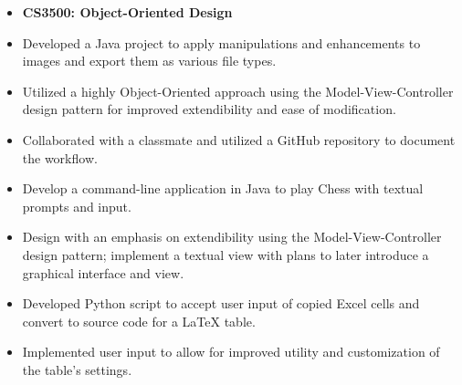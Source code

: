 \documentclass[10pt,a4paper,ragged2e,withhyper]{altacv}
\begin{document}
\begin{paracol}{2}

    \switchcolumn



    \vspace{-2em}
    \begin{itemize}
        \item[] \textbf{CS3500: Object-Oriented Design}
        \item Developed a Java project to apply manipulations and enhancements to images and export them as various file types.
        \item Utilized a highly Object-Oriented approach using the Model-View-Controller design pattern for improved extendibility and ease of modification.
        \item Collaborated with a classmate and utilized a GitHub repository to document the workflow.
    \end{itemize}

    \begin{itemize}
        \item Develop a command-line application in Java to play Chess with textual prompts and input.
        \item Design with an emphasis on extendibility using the Model-View-Controller design pattern; implement a textual view with plans to later introduce a graphical interface and view.
    \end{itemize}

    \begin{itemize}
        \item Developed Python script to accept user input of copied Excel cells and convert to source code for a LaTeX table.
        \item Implemented user input to allow for improved utility and customization of the table's settings.
    \end{itemize}


\end{paracol}
\end{document}
